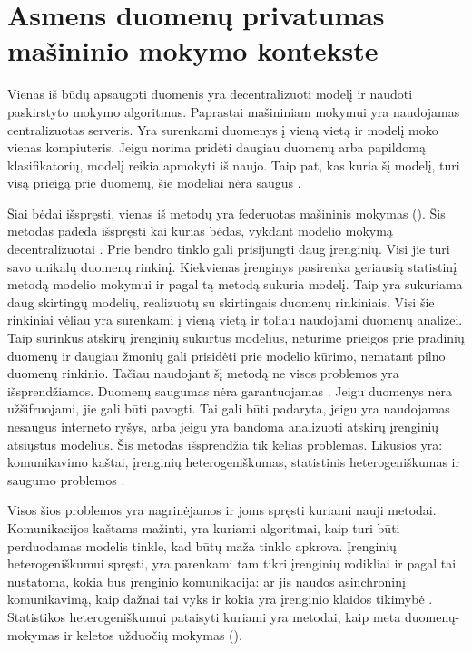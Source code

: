 \documentclass{VUMIFInfBakalaurinis}
\begin{document}
\section{Asmens duomenų privatumas mašininio mokymo kontekste}
	\par Vienas iš būdų apsaugoti duomenis yra decentralizuoti modelį ir naudoti paskirstyto mokymo algoritmus. Paprastai mašininiam mokymui yra naudojamas centralizuotas serveris. Yra surenkami duomenys į vieną vietą ir modelį moko vienas kompiuteris. Jeigu norima pridėti daugiau duomenų arba papildomą klasifikatorių, modelį reikia apmokyti iš naujo. Taip pat, kas kuria šį modelį, turi visą prieigą prie duomenų, šie modeliai nėra saugūs \cite{13}. 
	\par Šiai bėdai išspręsti, vienas iš metodų yra federuotas mašininis mokymas (). Šis metodas padeda išspręsti kai kurias bėdas, vykdant modelio mokymą decentralizuotai \cite{3}. Prie bendro tinklo gali prisijungti daug įrenginių. Visi jie turi savo unikalų duomenų rinkinį. Kiekvienas įrenginys pasirenka geriausią statistinį metodą modelio mokymui ir pagal tą metodą sukuria modelį. Taip yra sukuriama daug skirtingų modelių, realizuotų su skirtingais duomenų rinkiniais. Visi šie rinkiniai vėliau yra surenkami į vieną vietą ir toliau naudojami duomenų analizei. Taip surinkus atskirų įrenginių sukurtus modelius, neturime prieigos prie pradinių duomenų ir daugiau žmonių gali prisidėti prie modelio kūrimo, nematant pilno duomenų rinkinio. Tačiau naudojant šį metodą ne visos problemos yra išsprendžiamos. Duomenų saugumas nėra garantuojamas \cite{3}. Jeigu duomenys nėra užšifruojami, jie gali būti pavogti. Tai gali būti padaryta, jeigu yra naudojamas nesaugus interneto ryšys, arba jeigu yra bandoma analizuoti atskirų įrenginių atsiųstus modelius. Šis metodas išsprendžia tik kelias problemas. Likusios yra: komunikavimo kaštai, įrenginių heterogeniškumas, statistinis heterogeniškumas ir saugumo problemos \cite{4}.
	\par Visos šios problemos yra nagrinėjamos ir joms spręsti kuriami nauji metodai. Komunikacijos kaštams mažinti, yra kuriami algoritmai, kaip turi būti perduodamas modelis tinkle, kad būtų maža tinklo apkrova. Įrenginių heterogeniškumui spręsti, yra parenkami tam tikri įrenginių rodikliai ir pagal tai nustatoma, kokia bus įrenginio komunikacija: ar jis naudos asinchroninį komunikavimą, kaip dažnai tai vyks ir kokia yra įrenginio klaidos tikimybė \cite{4}. Statistikos heterogeniškumui pataisyti kuriami yra metodai, kaip meta duomenų-mokymas ir keletos užduočių mokymas (). 
\end{document}

